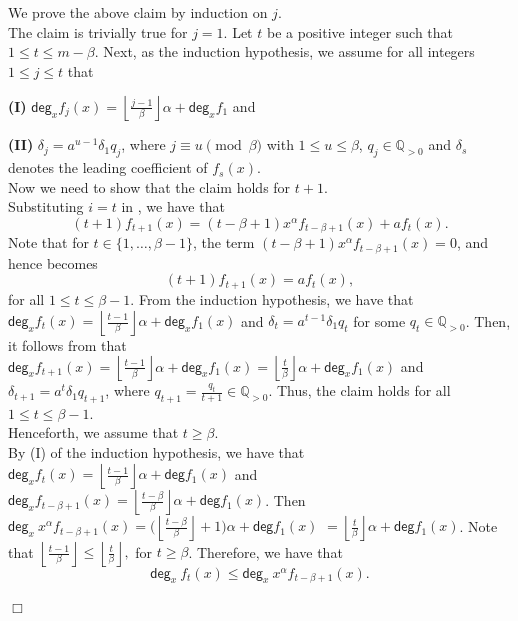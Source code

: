\documentclass[12pt,reqno]{amsart}
\renewcommand{\deg}{\mathsf{deg}}
\renewcommand{\leq}{\leqslant}
\renewcommand{\geq}{\geqslant}
\numberwithin{thm}{section}
\theoremstyle{definition}
\numberwithin{equation}{thm}
\renewenvironment{proof}{\par\noindent {\em Proof:}}{\hfill$\Box$\medskip}
\theoremstyle{plain}
\begin{document}
\begin{proof}
    \noindent We prove the above claim by induction on $j$.\\
    The claim is trivially true for $j=1$. Let $t$ be a positive integer such that $1\leq t \leq m-\beta.$ Next, as the induction hypothesis, we assume for all integers $1\leq j\leq t$ that
    
    \textbf{(I)} $\deg_x f_j(x)=\left\lfloor\frac{j-1}{\beta}\right\rfloor\alpha+\deg_x f_1$ and 
    
    \textbf{(II)} $\delta_j=a^{u-1}\delta_1q_j$, where $j\equiv u\pmod{\beta}$ with $1\le u \le \beta$, $q_j\in\mathbb{Q}_{>0}$ and $\delta_s$ denotes the leading coefficient of $f
_s(x)$. \\

    \noindent Now we need to show that the claim holds for $t+1$.\\
    Substituting $i=t$ in , we have that
    \begin{equation}\label{eq4:4}
        (t+1)f_{t+1}(x)=(t-\beta+1)x^\alpha f_{t-\beta+1}(x) +a f_t(x).
    \end{equation}
    Note that for $t\in \{1,\ldots, \beta-1\}$, the term $(t-\beta+1)x^\alpha f_{t-\beta+1}(x)=0$, and hence  becomes
    \begin{equation}\label{eq4:5}
        (t+1)f_{t+1}(x)=af_t(x),
    \end{equation}
      for all $1\le t \le \beta-1.$
    \noindent From the induction hypothesis, we have that $\deg_x f_t(x)=\left\lfloor \frac{t-1}{\beta}\right\rfloor \alpha+\deg_x f_1(x)$ and $\delta_t=a^{t-1}\delta_1 q_t$ for some $q_t\in \mathbb{Q}_{>0}$. Then, it follows from  that $\deg_x f_{t+1}(x)=\left\lfloor \frac{t-1}{\beta}\right\rfloor \alpha+\deg_x f_1(x)=\left\lfloor \frac{t}{\beta}\right\rfloor \alpha+\deg_x f_1(x)$ and $\delta_{t+1}=a^{t} \delta_1 q_{t+1}$, where $q_{t+1}=\frac{q_t}{t+1}\in \mathbb{Q}_{>0}.$ Thus, the claim holds for all $1\le t \le \beta-1.$ \\
    Henceforth, we assume that $t\geq \beta$.\\
    By (I) of the induction hypothesis, we have that $\deg_x f_{t}(x)=\left\lfloor \frac{t-1}{\beta} \right\rfloor \alpha+\deg f_1(x)$ and $\deg_x f_{t-\beta+1}(x)=\left\lfloor \frac{t-\beta}{\beta} \right\rfloor \alpha+\deg f_1(x)$. Then $\deg_x \ x^\alpha f_{t-\beta+1}(x)=\bigg(\left\lfloor \frac{t-\beta}{\beta} \right\rfloor +1\bigg) \alpha+\deg f_1(x)$ $= \left\lfloor \frac{t}{\beta} \right\rfloor \alpha+\deg f_1(x)$. Note that $\left\lfloor \frac{t-1}{\beta}\right\rfloor\leq \left\lfloor \frac{t}{\beta}\right\rfloor,$ for $t\geq \beta$. Therefore, we have that $$ \deg_x \ f_t(x)\leq \deg_x \ x^\alpha f_{t-\beta+1}(x).$$

\end{proof}
\end{document}
